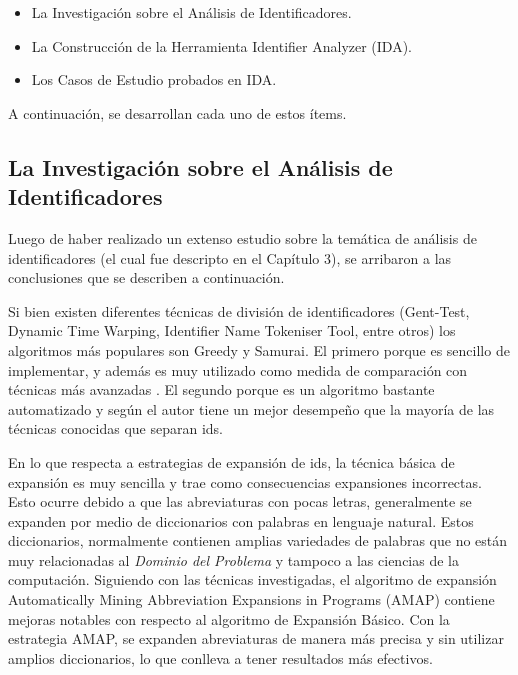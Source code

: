 \begin{itemize}

\item La Investigación sobre el Análisis de Identificadores.

\item La Construcción de la Herramienta Identifier Analyzer (IDA).

\item Los Casos de Estudio probados en IDA.

\end{itemize}

A continuación, se desarrollan cada uno de estos ítems.

\subsection{La Investigación sobre el Análisis de\\ Identificadores}

Luego de haber realizado un extenso estudio sobre la temática de análisis de identificadores (el cual fue descripto en el Capítulo 3), se arribaron a las conclusiones que se describen a continuación.

Si bien existen diferentes técnicas de división de identificadores (Gent-Test, Dynamic Time Warping,  Identifier Name Tokeniser Tool, entre otros) los algoritmos más populares son Greedy y Samurai. El primero porque es sencillo de implementar, y además es muy utilizado como medida de comparación con técnicas más avanzadas \cite{FBL06,HDD06,DLBD11,EDDLS13}. El segundo porque es un algoritmo bastante automatizado y según el autor \cite{EHPV09} tiene un mejor desempeño que la mayoría de las técnicas conocidas que separan ids.

En lo que respecta a estrategias de expansión de ids, la técnica básica de expansión es muy sencilla y trae como consecuencias expansiones incorrectas. Esto ocurre debido a que las abreviaturas con pocas letras, generalmente se expanden por medio de diccionarios con palabras en lenguaje natural. Estos diccionarios, normalmente contienen amplias variedades de palabras que no están muy relacionadas al \textit{Dominio del Problema} y tampoco a las ciencias de la computación.
Siguiendo con las técnicas investigadas, el algoritmo de expansión Automatically Mining Abbreviation Expansions in Programs (AMAP) \cite{EZH08} contiene mejoras notables con respecto al algoritmo de Expansión Básico. Con la estrategia AMAP, se expanden abreviaturas de manera más precisa y sin utilizar amplios diccionarios, lo que conlleva a tener resultados más efectivos.

